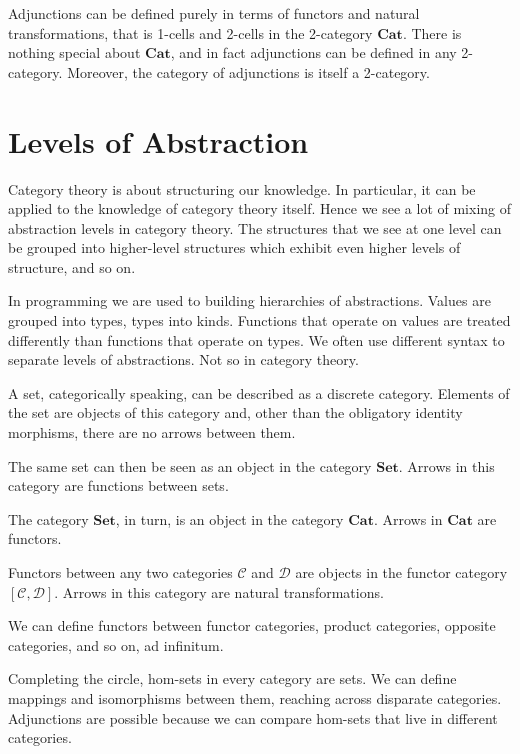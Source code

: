 \documentclass[DaoFP]{subfiles}
\begin{document}
Adjunctions can be defined purely in terms of functors and natural transformations, that is 1-cells and 2-cells in the 2-category $\mathbf{Cat}$. There is nothing special about $\mathbf{Cat}$, and in fact adjunctions can be defined in any 2-category. Moreover, the category of adjunctions is itself a 2-category.

\section{Levels of Abstraction}

Category theory is about structuring our knowledge. In particular, it can be applied to the knowledge of category theory itself. Hence we see a lot of mixing of abstraction levels in category theory. The structures that we see at one level can be grouped into higher-level structures which exhibit even higher levels of structure, and so on. 

In programming we are used to building hierarchies of abstractions. Values are grouped into types, types into kinds. Functions that operate on values are treated differently than functions that operate on types. We often use different syntax to separate levels of abstractions. Not so in category theory.

A set, categorically speaking, can be described as a discrete category. Elements of the set are objects of this category and, other than the obligatory identity morphisms, there are no arrows between them. 

The same set can then be seen as an object in the category $\mathbf{Set}$. Arrows in this category are functions between sets.

The category $\mathbf{Set}$, in turn, is an object in the category $\mathbf{Cat}$. Arrows in $\mathbf{Cat}$ are functors. 

Functors between any two categories $\mathcal{C}$ and $\mathcal{D}$ are objects in the functor category $[\mathcal{C}, \mathcal{D}]$. Arrows in this category are natural transformations.

We can define functors between functor categories, product categories, opposite categories, and so on, ad infinitum. 

Completing the circle, hom-sets in every category are sets. We can define mappings and isomorphisms between them, reaching across disparate categories. Adjunctions are possible because we can compare hom-sets that live in different categories.
\end{document}
